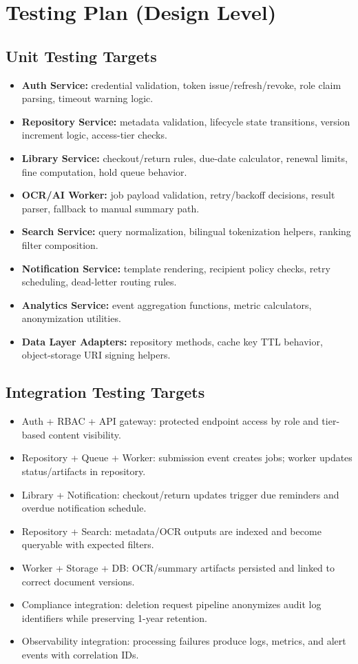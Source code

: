 \documentclass[12pt,a4paper]{article}
\begin{document}
\section{Testing Plan (Design Level)}
\subsection*{Unit Testing Targets}
\begin{itemize}
    \item \textbf{Auth Service:} credential validation, token issue/refresh/revoke, role claim parsing, timeout warning logic.
    \item \textbf{Repository Service:} metadata validation, lifecycle state transitions, version increment logic, access-tier checks.
    \item \textbf{Library Service:} checkout/return rules, due-date calculator, renewal limits, fine computation, hold queue behavior.
    \item \textbf{OCR/AI Worker:} job payload validation, retry/backoff decisions, result parser, fallback to manual summary path.
    \item \textbf{Search Service:} query normalization, bilingual tokenization helpers, ranking filter composition.
    \item \textbf{Notification Service:} template rendering, recipient policy checks, retry scheduling, dead-letter routing rules.
    \item \textbf{Analytics Service:} event aggregation functions, metric calculators, anonymization utilities.
    \item \textbf{Data Layer Adapters:} repository methods, cache key TTL behavior, object-storage URI signing helpers.
\end{itemize}

\subsection*{Integration Testing Targets}
\begin{itemize}
    \item Auth + RBAC + API gateway: protected endpoint access by role and tier-based content visibility.
    \item Repository + Queue + Worker: submission event creates jobs; worker updates status/artifacts in repository.
    \item Library + Notification: checkout/return updates trigger due reminders and overdue notification schedule.
    \item Repository + Search: metadata/OCR outputs are indexed and become queryable with expected filters.
    \item Worker + Storage + DB: OCR/summary artifacts persisted and linked to correct document versions.
    \item Compliance integration: deletion request pipeline anonymizes audit log identifiers while preserving 1-year retention.
    \item Observability integration: processing failures produce logs, metrics, and alert events with correlation IDs.
\end{itemize}
\end{document}
